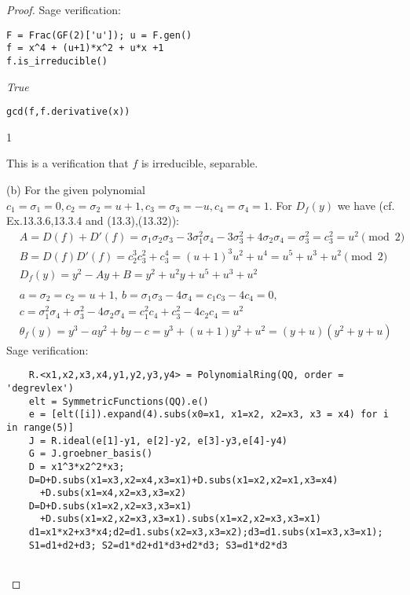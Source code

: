 \documentclass[11pt,a4paper]{article}
\begin{document}
{\begin{proof}
Sage verification:
\begin{verbatim}
F = Frac(GF(2)['u']); u = F.gen()
f = x^4 + (u+1)*x^2 + u*x +1
f.is_irreducible()
\end{verbatim}
\begin{center}
{\it True}
\end{center}
\begin{verbatim}
gcd(f,f.derivative(x))
\end{verbatim}
\begin{center}
1
\end{center}
This is a verification that $f$ is irreducible, separable.
\item[(b)] For the given polynomial $c_1=\sigma_1=0,c_2=\sigma_2=u+1,c_3=\sigma_3=-u,c_4=\sigma_4=1$. For $D_f(y)$ we have (cf. Ex.13.3.6,13.3.4 and (13.3),(13.32)):
\begin{align*}
& A=D(f)+ D'(f) =\sigma_1\sigma_2\sigma_3 -3 \sigma_1^2 \sigma_4 -3\sigma_3^2 + 4\sigma_2 \sigma_4=\sigma_3^2=c_3^2=u^2 \pmod 2\\
& B=D(f) D'(f)=c_2^3c_3^2+c_3^4=(u+1)^3u^2+u^4=u^5+u^3+u^2 \pmod 2\\
& D_f(y)=y^2-Ay+B=y^2+u^2y+u^5+u^3+u^2\\
& \\
& a=\sigma_2=c_2=u+1,~b=\sigma_1\sigma_3-4\sigma_4=c_1c_3-4c_4=0,\\
& c= \sigma_1^2\sigma_4+\sigma_3^2-4\sigma_2\sigma_4=c_1^2c_4+c_3^2-4c_2c_4=u^2\\
& \theta_f(y)=y^3-ay^2+by-c=y^3+(u+1)y^2+u^2=(y+u)(y^2+y+u)
\end{align*}
Sage verification:
\begin{verbatim}
    R.<x1,x2,x3,x4,y1,y2,y3,y4> = PolynomialRing(QQ, order = 'degrevlex')
    elt = SymmetricFunctions(QQ).e()
    e = [elt([i]).expand(4).subs(x0=x1, x1=x2, x2=x3, x3 = x4) for i in range(5)]
    J = R.ideal(e[1]-y1, e[2]-y2, e[3]-y3,e[4]-y4)
    G = J.groebner_basis()
    D = x1^3*x2^2*x3;
    D=D+D.subs(x1=x3,x2=x4,x3=x1)+D.subs(x1=x2,x2=x1,x3=x4)
      +D.subs(x1=x4,x2=x3,x3=x2)
    D=D+D.subs(x1=x2,x2=x3,x3=x1)
      +D.subs(x1=x2,x2=x3,x3=x1).subs(x1=x2,x2=x3,x3=x1)
    d1=x1*x2+x3*x4;d2=d1.subs(x2=x3,x3=x2);d3=d1.subs(x1=x3,x3=x1);
    S1=d1+d2+d3; S2=d1*d2+d1*d3+d2*d3; S3=d1*d2*d3


\end{verbatim}
\end{proof}}
\end{document}
